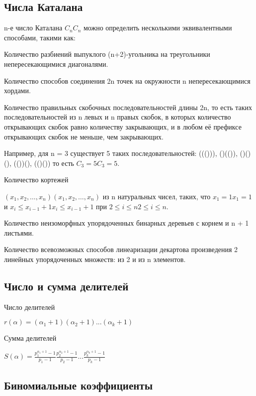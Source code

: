 \documentclass[a4paper]{article}
\begin{document}
\begin{multicols*}{2}
		  \subsection{Числа Каталана}
		  n-е число Каталана ${\displaystyle C_{n}}C_{n}$ можно определить несколькими эквивалентными способами, такими как:
		  
		  Количество разбиений выпуклого (n+2)-угольника на треугольники непересекающимися диагоналями.
		  
		  
		  Количество способов соединения 2n точек на окружности n непересекающимися хордами.
		  
		  
		  Количество правильных скобочных последовательностей длины 2n, то есть таких последовательностей из n левых и n правых скобок, в которых количество открывающих скобок равно количеству закрывающих, и в любом её префиксе открывающих скобок не меньше, чем закрывающих.
		  
		
		  Например, для n = 3 существует 5 таких последовательностей:
		  ((())), ()(()), ()()(), (())(), (()())
		  то есть ${\displaystyle C_{3}=5}C_{3}=5.$
		  
		  Количество кортежей 
		  
		  ${\displaystyle (x_{1},x_{2},\ldots ,x_{n})}{\displaystyle (x_{1},x_{2},\ldots ,x_{n})}$ из n натуральных чисел, таких, что ${\displaystyle x_{1}=1}x_1=1$ и ${\displaystyle x_{i}\leqslant x_{i-1}+1}{\displaystyle x_{i}\leqslant x_{i-1}+1}$ при ${\displaystyle 2\leqslant i\leqslant n}2 \leqslant i \leqslant n$.
		  
		  Количество неизоморфных упорядоченных бинарных деревьев с корнем и n + 1 листьями.
		  
		  Количество всевозможных способов линеаризации декартова произведения 2 линейных упорядоченных множеств: из 2 и из n элементов.
		  \subsection{Число и сумма делителей}
		  Число делителей
		  
		  $r(\alpha) = (\alpha_1 + 1)(\alpha_2 +1)...(\alpha_k+1)$
		  
		  Сумма делителей
		  
		  $S(\alpha) = \frac{p^{{\alpha_1}+1}_{1} - 1}{p_1 - 1} \frac{p^{{\alpha_2}+1}_{2} - 1}{p_2 - 1} ... \frac{p^{{\alpha_k}+1}_{k} - 1}{p_k - 1}$
		  \subsection{Биномиальные коэффициенты}
		  
		  

\end{multicols*}
\end{document}
